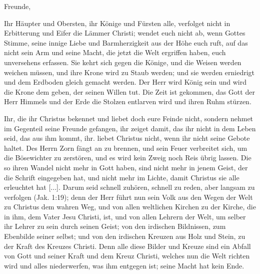 {
Freunde,

\bigskip

Ihr Häupter und Obersten, ihr Könige und Fürsten alle,
verfolget nicht in Erbitterung und Eifer die Lämmer Christi; wendet
euch nicht ab, wenn Gottes Stimme, seine innige Liebe und 
Barmherzigkeit aus der Höhe euch ruft, auf das nicht sein Arm und
seine Macht, die jetzt die Welt ergriffen 
haben, euch unversehens
erfassen. Sie kehrt sich gegen die Könige, und die Weisen werden
weichen müssen, und ihre Krone wird zu Staub werden; und sie
werden erniedrigt und dem Erdboden gleich gemacht werden. Der
Herr wird König sein und wird die Krone dem geben, der seinen
Willen tut. Die Zeit ist gekommen, das Gott der Herr Himmels
und der Erde die Stolzen entlarven wird und ihren Ruhm stürzen.

Ihr, die ihr Christus bekennet und liebet doch eure Feinde nicht,
sondern nehmet im Gegenteil seine Freunde gefangen, ihr zeiget
damit, das ihr nicht in dem Leben seid, das aus ihm kommt, ihr.
liebet Christus nicht, wenn ihr nicht seine Gebote haltet. Des
Herrn Zorn fängt an zu brennen, und sein Feuer verbreitet
sich, um die Bösewichter zu zerstören, und es wird kein Zweig
noch Reis übrig lassen. Die so ihren Wandel nicht mehr in
Gott haben, sind nicht mehr in jenem Geist, der die Schrift 
eingegeben hat, und nicht mehr im Lichte, damit Christus sie alle
erleuchtet hat [...]. Darum seid schnell zuhören, schnell zu reden,
aber langsam zu verfolgen (Jak. 1:19); 
denn der Herr führt nun
sein Volk aus den Wegen der Welt zu Christus dem wahren
Weg, und von allen weltlichen Kirchen zu der Kirche, die in ihm,
dem Vater Jesu Christi, ist, und von allen Lehrern der Welt,
um selber ihr Lehrer zu sein durch seinen Geist; von den irdischen
Bildnissen, zum Ebenbilde seiner selbst; und von den irdischen
Kreuzen aus Holz und Stein, zu der Kraft des Kreuzes Christi.
Denn alle diese Bilder und Kreuze sind ein Abfall von Gott und
seiner Kraft und dem Kreuz Christi, welches nun die Welt richten
wird und alles niederwerfen, was ihm entgegen ist; seine Macht
hat kein Ende.

}
